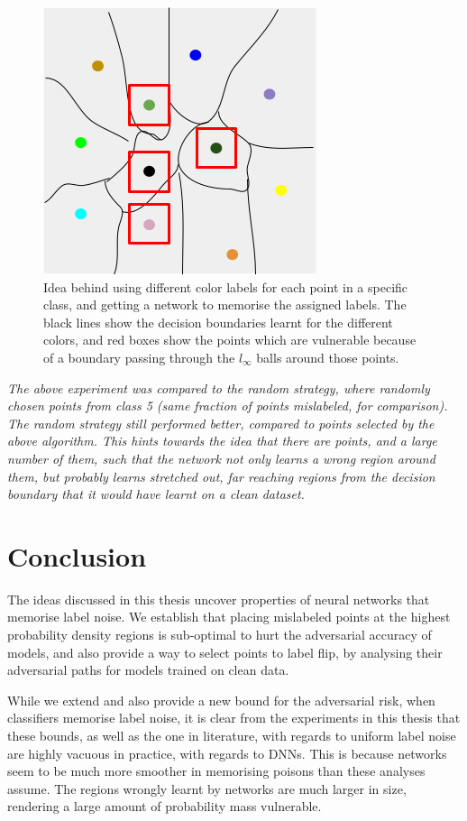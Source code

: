 \documentclass{ociamthesis}
\begin{document}
\begin{figure}
    \centering
    \includegraphics[scale=0.4, trim={0 0 0 0}, clip]{thesis-coloring-trick.png}
    \caption{Idea behind using different color labels for each point in a specific class, and getting a network to memorise the assigned labels. The black lines show the decision boundaries learnt for the different colors, and red boxes show the points which are vulnerable because of a boundary passing through the $l_\infty$ balls around those points.}
\end{figure}

\emph{The above experiment was compared to the random strategy, where randomly chosen points from class 5 (same fraction of points mislabeled, for comparison). The random strategy still performed better, compared to points selected by the above algorithm. This hints towards the idea that there are points, and a large number of them, such that the network not only learns a wrong region around them, but probably learns stretched out, far reaching regions from the decision boundary that it would have learnt on a clean dataset.}



\chapter{Conclusion}
The ideas discussed in this thesis uncover properties of neural networks that
memorise label noise. We establish that placing mislabeled points at the highest
probability density regions is sub-optimal to hurt the adversarial accuracy of
models, and also provide a way to select points to label flip, by analysing
their adversarial paths for models trained on clean data.

While we extend and also provide a new bound for the adversarial risk, when
classifiers memorise label noise, it is clear from the experiments in this
thesis that these bounds, as well as the one in literature, with regards to
uniform label noise are highly vacuous in practice, with regards to DNNs. This
is because networks seem to be much more smoother in memorising poisons than
these analyses assume. The regions wrongly learnt by networks are much larger in
size, rendering a large amount of probability mass vulnerable.
\end{document}
